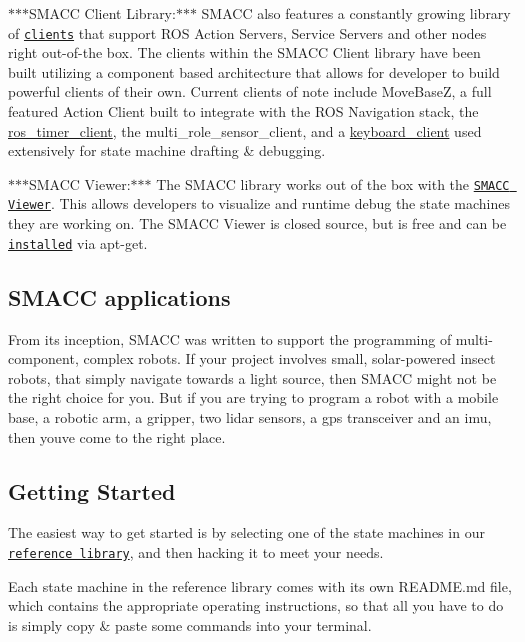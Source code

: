\begin{DoxyItemize}
\item $\ast$$\ast$$\ast$\+S\+M\+A\+CC Client Library\+:$\ast$$\ast$$\ast$ S\+M\+A\+CC also features a constantly growing library of \href{https://github.com/reelrbtx/SMACC/tree/master/smacc_client_library}{\tt clients} that support R\+OS Action Servers, Service Servers and other nodes right out-\/of-\/the box. The clients within the S\+M\+A\+CC Client library have been built utilizing a component based architecture that allows for developer to build powerful clients of their own. Current clients of note include Move\+BaseZ, a full featured Action Client built to integrate with the R\+OS Navigation stack, the \hyperlink{namespaceros__timer__client}{ros\+\_\+timer\+\_\+client}, the multi\+\_\+role\+\_\+sensor\+\_\+client, and a \hyperlink{namespacekeyboard__client}{keyboard\+\_\+client} used extensively for state machine drafting \& debugging.
\begin{DoxyItemize}
\item $\ast$$\ast$$\ast$\+S\+M\+A\+CC Viewer\+:$\ast$$\ast$$\ast$ The S\+M\+A\+CC library works out of the box with the \href{https://www.youtube.com/watch?v=WVt4M_teA5I}{\tt S\+M\+A\+CC Viewer}. This allows developers to visualize and runtime debug the state machines they are working on. The S\+M\+A\+CC Viewer is closed source, but is free and can be \href{http://smacc.ninja/smacc-viewer/}{\tt installed} via apt-\/get.
\end{DoxyItemize}
\end{DoxyItemize}

\subsection*{S\+M\+A\+CC applications}

From it\textquotesingle{}s inception, S\+M\+A\+CC was written to support the programming of multi-\/component, complex robots. If your project involves small, solar-\/powered insect robots, that simply navigate towards a light source, then S\+M\+A\+CC might not be the right choice for you. But if you are trying to program a robot with a mobile base, a robotic arm, a gripper, two lidar sensors, a gps transceiver and an imu, then you\textquotesingle{}ve come to the right place.

 

\subsection*{Getting Started}

The easiest way to get started is by selecting one of the state machines in our \href{https://github.com/reelrbtx/SMACC/tree/master/smacc_sm_reference_library}{\tt reference library}, and then hacking it to meet your needs.

Each state machine in the reference library comes with it\textquotesingle{}s own R\+E\+A\+D\+M\+E.\+md file, which contains the appropriate operating instructions, so that all you have to do is simply copy \& paste some commands into your terminal. 